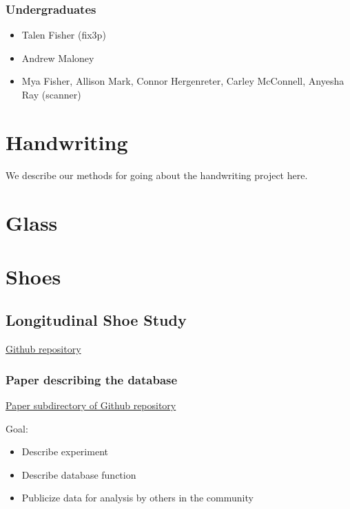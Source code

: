 \documentclass[]{book}
\providecommand{\tightlist}{%
  \setlength{\itemsep}{0pt}\setlength{\parskip}{0pt}}
\begin{document}
\hypertarget{undergraduates}{%
\subsection{Undergraduates}\label{undergraduates}}

\begin{itemize}
\tightlist
\item
  Talen Fisher (fix3p)
\item
  Andrew Maloney
\item
  Mya Fisher, Allison Mark, Connor Hergenreter, Carley McConnell, Anyesha Ray (scanner)
\end{itemize}

\hypertarget{handwriting}{%
\chapter{Handwriting}\label{handwriting}}

We describe our methods for going about the handwriting project here.

\hypertarget{glass}{%
\chapter{Glass}\label{glass}}

\hypertarget{shoes}{%
\chapter{Shoes}\label{shoes}}

\hypertarget{longitudinal}{%
\section{Longitudinal Shoe Study}\label{longitudinal}}

\href{https://github.com/CSAFE-ISU/Longitudinal_Shoe_Study}{Github repository}

\hypertarget{paper-describing-the-database}{%
\subsection{Paper describing the database}\label{paper-describing-the-database}}

\href{https://github.com/CSAFE-ISU/Longitudinal_Shoe_Study/tree/master/Paper}{Paper subdirectory of Github repository}

Goal:

\begin{itemize}
\tightlist
\item
  Describe experiment
\item
  Describe database function
\item
  Publicize data for analysis by others in the community
\end{itemize}
\end{document}
